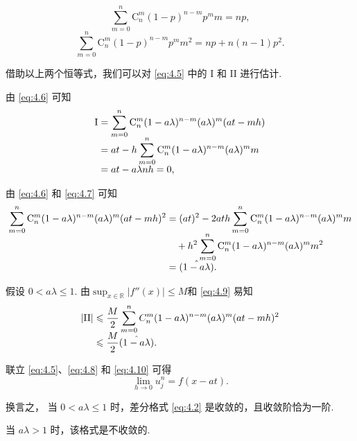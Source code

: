 \begin{instance}
\begin{important}[两个基本恒等式]
    \vspace{-1.5 em}
    \begin{equation}
        \sum_{m=0}^n \mathrm{C}_n^m (1 - p)^{n-m} p^m m = np, \label{eq:4.6}
    \end{equation}
    \begin{equation}
        \sum_{m=0}^n \mathrm{C}_n^m (1 - p)^{n-m} p^m m^2 = np + n(n - 1) p^2. \label{eq:4.7}
    \end{equation}
\end{important}
借助以上两个恒等式，我们可以对 \eqref{eq:4.5} 中的 $\mathrm{I}$ 和 $\mathrm{II}$ 进行估计.

\noindent {} 由 \eqref{eq:4.6} 可知
\begin{equation}
    \setjot[-2]\begin{aligned}
        \mathrm{I} &= \sum_{m=0}^n \mathrm{C}_n^m (1 - a\lambda)^{n-m} (a\lambda)^m (at - mh) \\
        &= at - h \sum_{m=0}^n \mathrm{C}_n^m (1 - a\lambda)^{n-m} (a\lambda)^m m \\
        &= at - a\lambda nh = 0,
    \end{aligned} \label{eq:4.8}
\end{equation}

\noindent{} 由 \eqref{eq:4.6} 和 \eqref{eq:4.7} 可知
\begin{equation}
    \setjot[-2]\begin{aligned}
        \sum_{m=0}^n \mathrm{C}_n^m (1 - a\lambda)^{n-m} (a\lambda)^m (at - mh)^2 
        &= (at)^2 - 2ath \sum_{m=0}^n \mathrm{C}_n^m (1 - a\lambda)^{n-m} (a\lambda)^m m \\
        &\quad + h^2 \sum_{m=0}^n \mathrm{C}_n^m (1 - a\lambda)^{n-m} (a\lambda)^m m^2 \\
        &= \hat{(1 - a\lambda)}.
    \end{aligned} \label{eq:4.9}
\end{equation}

假设 $0 < a\lambda \leq 1$. 由$\sup_{x \in \mathbb{R}} |f''(x)| \leq M$和 \eqref{eq:4.9} 易知
\begin{equation}
    \setjot[-2]\begin{aligned}
        |\mathrm{II}| &\leq \frac{M}{2} \sum_{m=0}^n C_n^m (1 - a\lambda)^{n-m} (a\lambda)^m (at - mh)^2 \\
        &\leq \frac{M}{2} \hat{(1 - a\lambda)}.
    \end{aligned} \label{eq:4.10}
\end{equation}

联立 \eqref{eq:4.5}、\eqref{eq:4.8} 和 \eqref{eq:4.10} 可得
\[ \lim_{h \to 0} u_j^n = f(x - at). \]

换言之，{\color{red} 当 $0 < a\lambda \leq 1$ 时}，差分格式 \eqref{eq:4.2} 是收敛的，且收敛阶恰为一阶.

\begin{remark}
    当 $a\lambda > 1$ 时，该格式是不收敛的.
\end{remark}
\end{instance}

